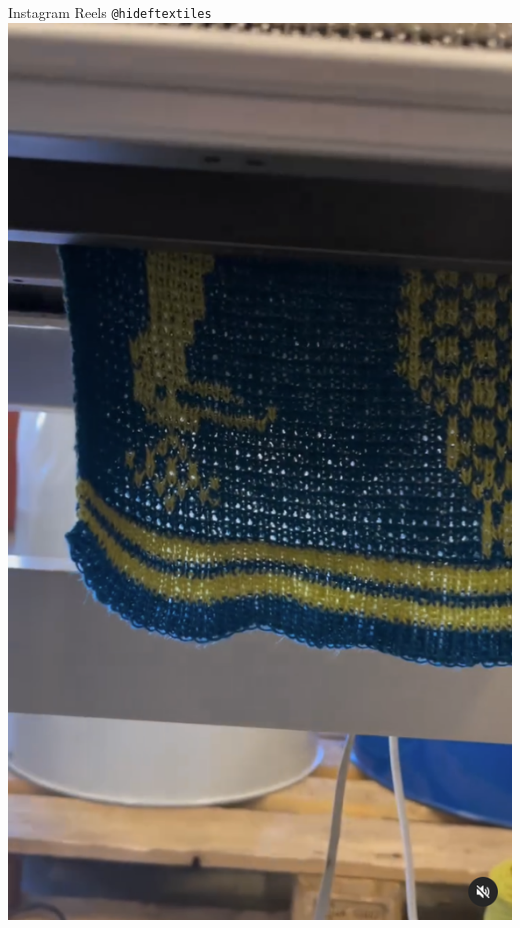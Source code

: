 \documentclass[
    NAME={Dr. Helga Ingimundardóttir},
    EMAIL={helgaingim@hi.is},
    FACULTY={Industrial Engineering},
    TITLE={HiDef Textiles: Reviving Tradition with Innovation},
    SUBTITLE={Empowering Creativity and Sustainability in Textile Production through Digital Transformation},
    SEMINAR={Reykjavík DataBeers},
    DATE={January 25, 2025},
    WIDE={true}
]{HI-LaTeX/hi-beamer}
\begin{document}
\begin{frame}{Instagram Reels \texttt{@hideftextiles}}
        \href{https://www.instagram.com/p/C9Cf8FFgDZZ}{\includegraphics[height=0.8\textheight]{include/C9Cf8FFgDZZ.png}}

\end{frame}
\end{document}
